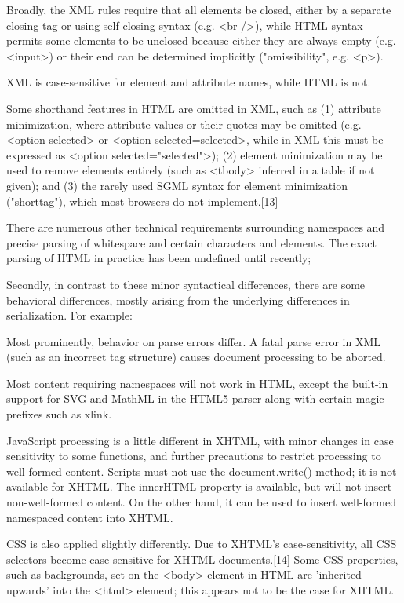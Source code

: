 \begin{compactitem}
\item Broadly, the XML rules require that all elements be closed, either by a separate closing tag or using self-closing syntax (e.g. <br />), while HTML syntax permits some elements to be unclosed because either they are always empty (e.g. <input>) or their end can be determined implicitly ("omissibility", e.g. <p>).
\item XML is case-sensitive for element and attribute names, while HTML is not.
\item Some shorthand features in HTML are omitted in XML, such as (1) attribute minimization, where attribute values or their quotes may be omitted (e.g. <option selected> or <option selected=selected>, while in XML this must be expressed as <option selected="selected">); (2) element minimization may be used to remove elements entirely (such as <tbody> inferred in a table if not given); and (3) the rarely used SGML syntax for element minimization ("shorttag"), which most browsers do not implement.[13]
\item There are numerous other technical requirements surrounding namespaces and precise parsing of whitespace and certain characters and elements. The exact parsing of HTML in practice has been undefined until recently;
\end{compactitem}


Secondly, in contrast to these minor syntactical differences, there are some behavioral differences, mostly arising from the underlying differences in serialization. For example:

\begin{compactitem}
\item Most prominently, behavior on parse errors differ. A fatal parse error in XML (such as an incorrect tag structure) causes document processing to be aborted.
\item Most content requiring namespaces will not work in HTML, except the built-in support for SVG and MathML in the HTML5 parser along with certain magic prefixes such as xlink.
\item JavaScript processing is a little different in XHTML, with minor changes in case sensitivity to some functions, and further precautions to restrict processing to well-formed content. Scripts must not use the document.write() method; it is not available for XHTML. The innerHTML property is available, but will not insert non-well-formed content. On the other hand, it can be used to insert well-formed namespaced content into XHTML.
\item CSS is also applied slightly differently. Due to XHTML's case-sensitivity, all CSS selectors become case sensitive for XHTML documents.[14] Some CSS properties, such as backgrounds, set on the <body> element in HTML are 'inherited upwards' into the <html> element; this appears not to be the case for XHTML.
\end{compactitem}




